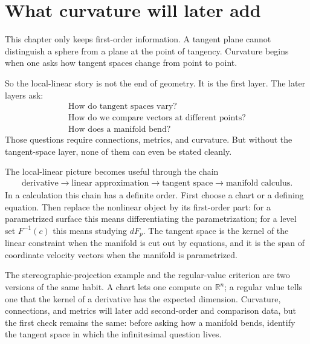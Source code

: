 \section{What curvature will later add}

This chapter only keeps first-order information.  A tangent plane cannot distinguish a sphere from a plane at the point of tangency.  Curvature begins when one asks how tangent spaces change from point to point.

So the local-linear story is not the end of geometry.  It is the first layer.  The later layers ask:
\[
\begin{array}{c}
\text{How do tangent spaces vary?}\\
\text{How do we compare vectors at different points?}\\
\text{How does a manifold bend?}
\end{array}
\]
Those questions require connections, metrics, and curvature.  But without the tangent-space layer, none of them can even be stated cleanly.

The local-linear picture becomes useful through the chain
\[
\begin{array}{c}
\text{derivative} \longrightarrow
\text{linear approximation} \longrightarrow
\text{tangent space} \longrightarrow
\text{manifold calculus}.
\end{array}
\]
In a calculation this chain has a definite order.  First choose a chart or a defining equation.  Then replace the nonlinear object by its first-order part: for a parametrized surface this means differentiating the parametrization; for a level set \(F^{-1}(c)\) this means studying \(dF_p\).  The tangent space is the kernel of the linear constraint when the manifold is cut out by equations, and it is the span of coordinate velocity vectors when the manifold is parametrized.

The stereographic-projection example and the regular-value criterion are two versions of the same habit.  A chart lets one compute on \(\mathbb R^n\); a regular value tells one that the kernel of a derivative has the expected dimension.  Curvature, connections, and metrics will later add second-order and comparison data, but the first check remains the same: before asking how a manifold bends, identify the tangent space in which the infinitesimal question lives.
